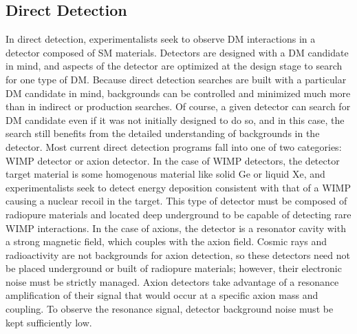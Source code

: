\subsection{Direct Detection}
In direct detection, experimentalists seek to observe \ac{DM} interactions in a detector composed of \ac{SM} materials. Detectors are designed with a \ac{DM} candidate in mind, and aspects of the detector are optimized at the design stage to search for one type of \ac{DM}. Because direct detection searches are built with a particular \ac{DM} candidate in mind, backgrounds can be controlled and minimized much more than in indirect or production searches. Of course, a given detector can search for \ac{DM} candidate even if it was not initially designed to do so, and in this case, the search still benefits from the detailed understanding of backgrounds in the detector. Most current direct detection programs fall into one of two categories: \ac{WIMP} detector or axion detector. In the case of \ac{WIMP} detectors, the detector target material is some homogenous material like solid Ge or liquid Xe, and experimentalists seek to detect energy deposition consistent with that of a \ac{WIMP} causing a nuclear recoil in the target. This type of detector must be composed of radiopure materials and located deep underground to be capable of detecting rare \ac{WIMP} interactions. In the case of axions, the detector is a resonator cavity with a strong magnetic field, which couples with the axion field. Cosmic rays and radioactivity are not backgrounds for axion detection, so these detectors need not be placed underground or built of radiopure materials; however, their electronic noise must be strictly managed. Axion detectors take advantage of a resonance amplification of their signal that would occur at a specific axion mass and coupling. To observe the resonance signal, detector background noise must be kept sufficiently low. 

